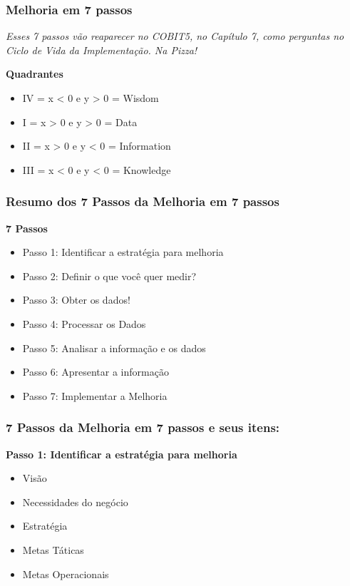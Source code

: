 \subsubsection{Melhoria em 7 passos}

\begin{center}
	\emph{Esses 7 passos vão reaparecer no COBIT5, no Capítulo 7, como perguntas no Ciclo de Vida da Implementação. Na Pizza!}
\end{center}


\textbf{Quadrantes}
\begin{itemize}
	\item IV = x < 0 e y > 0 = Wisdom
	\item I = x > 0 e y > 0  = Data
	\item II = x > 0 e y < 0 = Information
	\item III = x < 0 e y < 0 = Knowledge
\end{itemize}

\subsubsection{Resumo dos 7 Passos da Melhoria em 7 passos}

\textbf{7 Passos}
\begin{itemize}
	\item Passo 1: Identificar a estratégia para melhoria
	\item Passo 2: Definir o que você quer medir?
	\item Passo 3: Obter os dados!
	\item Passo 4: Processar os Dados
	\item Passo 5: Analisar a informação e os dados
	\item Passo 6: Apresentar a informação
	\item Passo 7: Implementar a Melhoria
\end{itemize}

\subsubsection{7 Passos da Melhoria em 7 passos e seus itens:}

\textbf{Passo 1: Identificar a estratégia para melhoria}
\begin{itemize}
	\item Visão
	\item Necessidades do negócio
	\item Estratégia
	\item Metas Táticas
	\item Metas Operacionais
\end{itemize}

